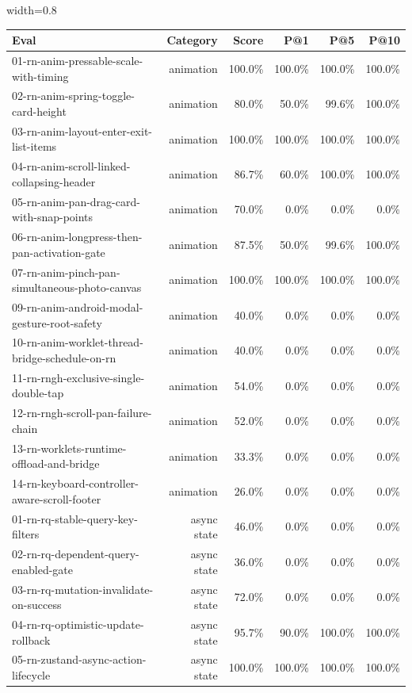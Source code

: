 \begin{table}[htbp]
\centering
\begin{adjustbox}{width=0.8\textwidth}
\begin{tabular}{lrrrrr}
\toprule
Eval & Category & Score & P@1 & P@5 & P@10 \\
\midrule
01-rn-anim-pressable-scale-with-timing & animation & 100.0\% & 100.0\% & 100.0\% & 100.0\% \\
02-rn-anim-spring-toggle-card-height & animation & 80.0\% & 50.0\% & 99.6\% & 100.0\% \\
03-rn-anim-layout-enter-exit-list-items & animation & 100.0\% & 100.0\% & 100.0\% & 100.0\% \\
04-rn-anim-scroll-linked-collapsing-header & animation & 86.7\% & 60.0\% & 100.0\% & 100.0\% \\
05-rn-anim-pan-drag-card-with-snap-points & animation & 70.0\% & 0.0\% & 0.0\% & 0.0\% \\
06-rn-anim-longpress-then-pan-activation-gate & animation & 87.5\% & 50.0\% & 99.6\% & 100.0\% \\
07-rn-anim-pinch-pan-simultaneous-photo-canvas & animation & 100.0\% & 100.0\% & 100.0\% & 100.0\% \\
09-rn-anim-android-modal-gesture-root-safety & animation & 40.0\% & 0.0\% & 0.0\% & 0.0\% \\
10-rn-anim-worklet-thread-bridge-schedule-on-rn & animation & 40.0\% & 0.0\% & 0.0\% & 0.0\% \\
11-rn-rngh-exclusive-single-double-tap & animation & 54.0\% & 0.0\% & 0.0\% & 0.0\% \\
12-rn-rngh-scroll-pan-failure-chain & animation & 52.0\% & 0.0\% & 0.0\% & 0.0\% \\
13-rn-worklets-runtime-offload-and-bridge & animation & 33.3\% & 0.0\% & 0.0\% & 0.0\% \\
14-rn-keyboard-controller-aware-scroll-footer & animation & 26.0\% & 0.0\% & 0.0\% & 0.0\% \\
01-rn-rq-stable-query-key-filters & async state & 46.0\% & 0.0\% & 0.0\% & 0.0\% \\
02-rn-rq-dependent-query-enabled-gate & async state & 36.0\% & 0.0\% & 0.0\% & 0.0\% \\
03-rn-rq-mutation-invalidate-on-success & async state & 72.0\% & 0.0\% & 0.0\% & 0.0\% \\
04-rn-rq-optimistic-update-rollback & async state & 95.7\% & 90.0\% & 100.0\% & 100.0\% \\
05-rn-zustand-async-action-lifecycle & async state & 100.0\% & 100.0\% & 100.0\% & 100.0\% \\

\end{tabular}
\end{adjustbox}
\end{table}
